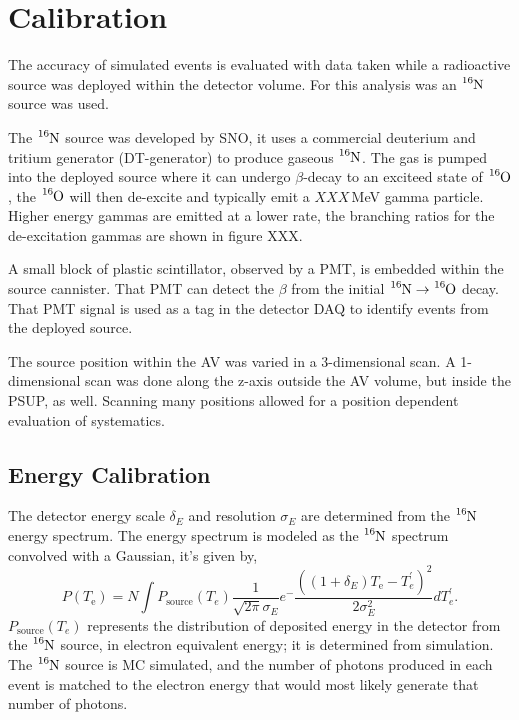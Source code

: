 \section{Calibration}
The accuracy of simulated events is evaluated with data taken while a
radioactive source was deployed within the detector volume.
For this analysis was an $\ce{^{16}N}$ source was used.

The $\ce{^{16}N}$ source was developed by SNO, it uses a commercial
deuterium and tritium generator (DT-generator) to produce gaseous $\ce{^{16}N}$.
The gas is pumped into the deployed source where it can undergo $\beta$-decay
to an exciteed state of $\ce{^{16}O}$, the $\ce{^{16}O}$ will then de-excite
and typically emit a $XXX$\,MeV gamma particle. Higher energy gammas are emitted
at a lower rate, the branching ratios for the de-excitation gammas are shown in
figure XXX.

A small block of plastic scintillator, observed by a PMT, is embedded within the
source cannister. That PMT can detect the $\beta$ from the initial
$\ce{^{16}N} \rightarrow \ce{^{16}O}$ decay. That PMT signal is used as a
tag in the detector DAQ to identify events from the deployed source.

The source position within the AV was varied in a 3-dimensional
scan.
A 1-dimensional scan was done along the z-axis outside the AV volume,
but inside the PSUP, as well.
Scanning many positions allowed for a position dependent evaluation of
systematics.

\subsection{Energy Calibration}
The detector energy scale $\delta_{E}$ and resolution $\sigma_{E}$ are determined
from the $\ce{^{16}N}$ energy spectrum.
The energy spectrum is modeled as the $\ce{^{16}N}$ spectrum convolved with a 
Gaussian, it's given by,
\begin{equation}
  P(T_\mathrm{e}) = N \int P_\mathrm{source}(T_{e})\frac{1}{\sqrt{2\pi}\sigma_{E}}e^-{\frac{((1+\delta_E)T_\mathrm{e}-T^{\prime}_{e})^2}{2\sigma^{2}_{E}}}dT^{\prime}_{e}\text{.}%
\label{eq:convolution}
\end{equation}
$P_\mathrm{source}(T_{e})$ represents the distribution of deposited energy in
the detector from the $\ce{^{16}N}$ source, in electron equivalent energy;
it is determined from simulation.
The $\ce{^{16}N}$ source is MC simulated, and the number of photons produced in
each event is
matched to the electron energy that would most likely generate that number
of photons.


